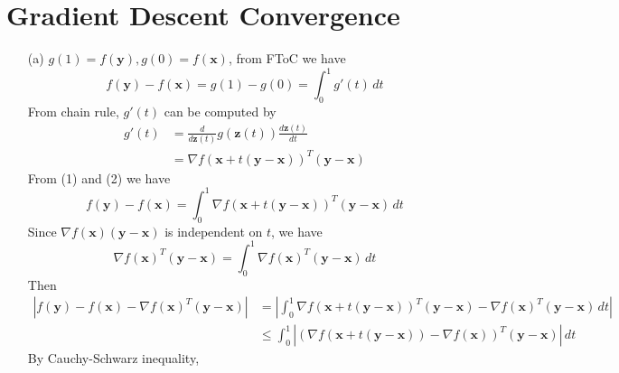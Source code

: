 \documentclass[12pt,a4paper]{article}
\begin{document}
\section{Gradient Descent Convergence}

\begin{enumerate}
    \item[(a)]
        $g(1) = f(\mathbf{y}), g(0) = f(\mathbf{x})$, from FToC we have 
        \begin{equation}
            f(\mathbf{y}) - f(\mathbf{x}) = g(1) - g(0) = \int_{0}^{1} g'(t) \,dt 
        \end{equation}
        From chain rule, $g'(t)$ can be computed by
        \begin{equation}
            \begin{split}
                g'(t) 
                    &= \frac{d}{d\mathbf{z}(t)}g(\mathbf{z}(t)) \frac{d \mathbf{z}(t)}{dt}\\
                    &= \nabla f(\mathbf{x} + t(\mathbf{y}-\mathbf{x}))^T(\mathbf{y}-\mathbf{x})
            \end{split}
        \end{equation}
        From (1) and (2) we have
        \begin{equation*}
            f(\mathbf{y}) - f(\mathbf{x}) = \int_{0}^{1} \nabla f(\mathbf{x} + t(\mathbf{y}-\mathbf{x}))^T(\mathbf{y}-\mathbf{x}) \,dt
        \end{equation*}
        Since $\nabla f(\mathbf{x})(\mathbf{y}-\mathbf{x})$ is independent on $t$, we have
        \begin{equation*}
            \nabla f(\mathbf{x})^T(\mathbf{y}-\mathbf{x}) =\int_{0}^{1} \nabla f(\mathbf{x})^T(\mathbf{y}-\mathbf{x}) \,dt 
        \end{equation*}
        Then
        \begin{equation*}
            \begin{split}
                |f(\mathbf{y}) - f(\mathbf{x}) - \nabla f(\mathbf{x})^T(\mathbf{y}-\mathbf{x})| 
                    &= |\int_{0}^{1} \nabla f(\mathbf{x} + t(\mathbf{y}-\mathbf{x}))^T(\mathbf{y}-\mathbf{x}) - \nabla f(\mathbf{x})^T(\mathbf{y}-\mathbf{x})\,dt|\\
                    &\leq \int_{0}^{1} \left\lvert (\nabla f(\mathbf{x} + t(\mathbf{y}-\mathbf{x})) - \nabla f(\mathbf{x}))^T(\mathbf{y}-\mathbf{x})\right\rvert \,dt
            \end{split}
        \end{equation*}
        By Cauchy-Schwarz inequality, 

\end{enumerate}
\end{document}
